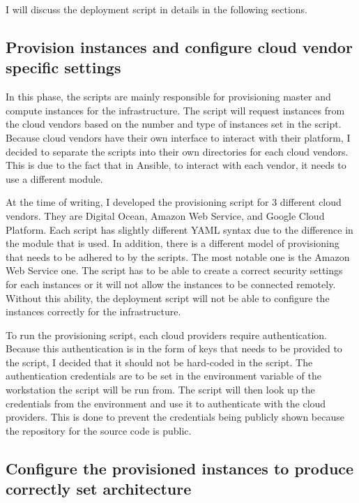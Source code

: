 I will discuss the deployment script in details in the following sections.


\subsection{Provision instances and configure cloud vendor specific settings}

In this phase, the scripts are mainly responsible for provisioning master and compute instances for the infrastructure. The script will request instances from the cloud vendors based on the number and type of instances set in the script. Because cloud vendors have their own interface to interact with their platform, I decided to separate the scripts into their own directories for each cloud vendors. This is due to the fact that in Ansible, to interact with each vendor, it needs to use a different module.

At the time of writing, I developed the provisioning script for 3 different cloud vendors. They are Digital Ocean, Amazon Web Service, and Google Cloud Platform. Each script has slightly different YAML syntax due to the difference in the module that is used. In addition, there is a different model of provisioning that needs to be adhered to by the scripts. The most notable one is the Amazon Web Service one. The script has to be able to create a correct security settings for each instances or it will not allow the instances to be connected remotely. Without this ability, the deployment script will not be able to configure the instances correctly for the infrastructure.

To run the provisioning script, each cloud providers require authentication. Because this authentication is in the form of keys that needs to be provided to the script, I decided that it should not be hard-coded in the script. The authentication credentials are to be set in the environment variable of the workstation the script will be run from. The script will then look up the credentials from the environment and use it to authenticate with the cloud providers. This is done to prevent the credentials being publicly shown because the repository for the source code is public.

\subsection{Configure the provisioned instances to produce correctly set architecture}

